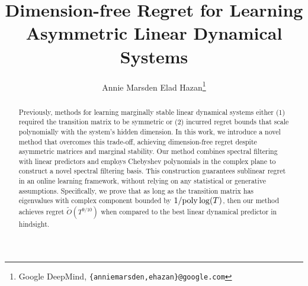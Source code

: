 \documentclass{article}
\title{Dimension-free Regret for Learning \\ Asymmetric Linear Dynamical Systems}
\author{  Annie Marsden \And Elad Hazan\thanks{Google DeepMind, \texttt{\{anniemarsden,ehazan\}@google.com} }}
\begin{document}
\maketitle

\begin{abstract}%
Previously, methods for learning marginally stable linear dynamical systems either (1) required the transition matrix to be symmetric or (2) incurred regret bounds that scale polynomially with the system’s hidden dimension. In this work, we introduce a novel method that overcomes this trade-off, achieving dimension-free regret despite asymmetric matrices and marginal stability. Our method combines spectral filtering with linear predictors and employs Chebyshev polynomials in the complex plane to construct a novel spectral filtering basis. This construction guarantees sublinear regret in an online learning framework, without relying on any statistical or generative assumptions. Specifically, we prove that as long as the transition matrix has eigenvalues with complex component bounded by $1/\mathrm{poly} \log(T)$, then our method achieves regret $\tilde{O}(T^{9/10})$ when compared to the best linear dynamical predictor in hindsight. 
\end{abstract}


 






 
\newpage




\newpage
\appendix



\end{document}
